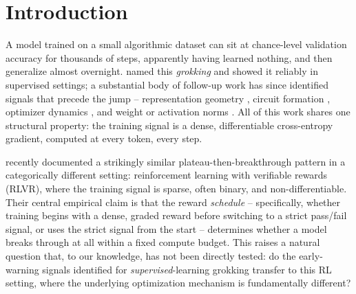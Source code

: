\documentclass{article}
\begin{document}
\section{Introduction}
\label{sec:intro}

A model trained on a small algorithmic dataset can sit at chance-level validation
accuracy for thousands of steps, apparently having learned nothing, and then
generalize almost overnight. \citet{power2022grokking} named this
\emph{grokking} and showed it reliably in supervised settings; a substantial
body of follow-up work has since identified signals that precede the jump --
representation geometry \citep{liu2022effective,nanda2023progress}, circuit
formation \citep{varma2023explaining}, optimizer dynamics
\citep{thilak2022slingshot,kumar2024grokking}, and weight or activation norms
\citep{liu2023omnigrok}. All of this work shares one structural property: the
training signal is a dense, differentiable cross-entropy gradient, computed at
every token, every step.

\citet{sun2026rlgrokking} recently documented a strikingly similar
plateau-then-breakthrough pattern in a categorically different setting:
reinforcement learning with verifiable rewards (RLVR), where the training signal
is sparse, often binary, and non-differentiable. Their central empirical claim is
that the reward \emph{schedule} -- specifically, whether training begins with a
dense, graded reward before switching to a strict pass/fail signal, or uses the
strict signal from the start -- determines whether a model breaks through at all
within a fixed compute budget. This raises a natural question that, to our
knowledge, has not been directly tested: do the early-warning signals identified
for \emph{supervised}-learning grokking transfer to this RL setting, where the
underlying optimization mechanism is fundamentally different?
\end{document}
